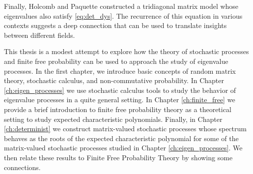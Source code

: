 
Finally, Holcomb and Paquette \cite{article:holcomb_paquette} constructed a tridiagonal matrix model whose eigenvalues also satisfy \eqref{eq:det_dys}. The recurrence of this equation in various contexts suggests a deep connection that can be used to translate insights between different fields.

This thesis is a modest attempt to explore how the theory of stochastic processes and finite free probability can be used to approach the study of eigenvalue processes. In the first chapter, we introduce basic concepts of random matrix theory, stochastic calculus, and non-commutative probability. In Chapter \ref{ch:eigen_processes} we use stochastic calculus tools to study the behavior of eigenvalue processes in a quite general setting. In Chapter \ref{ch:finite_free} we provide a brief introduction to finite free probability theory as a theoretical setting to study expected characteristic polynomials. Finally, in Chapter \ref{ch:determinist} we construct matrix-valued stochastic processes whose spectrum behaves as the roots of the expected characteristic polynomial for some of the matrix-valued stochastic processes studied in Chapter \ref{ch:eigen_processes}. We then relate these results to Finite Free Probability Theory by showing some connections. 





